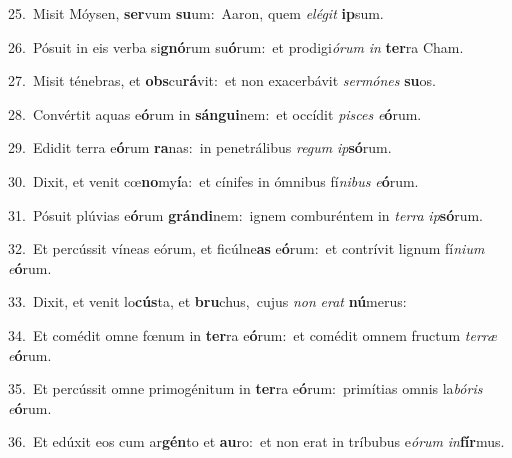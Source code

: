 {\numbfont\textcolor{\numbcolor}{25.}}~Misit Móysen, \textbf{ser}\-vum \textbf{su}\-um:~\star Aaron, quem \textit{e}\-\textit{lé}\textit{git} \textbf{ip}\-sum.\par
{\numbfont\textcolor{\numbcolor}{26.}}~Pósuit in eis verba si\-\textbf{gnó}\-rum su\-\textbf{ó}\-rum:~\star et prodigi\-\textit{ó}\-\textit{rum} \textit{in} \textbf{ter}\-ra Cham.\par
{\numbfont\textcolor{\numbcolor}{27.}}~Misit ténebras, et \textbf{obs}\-cu\-\textbf{rá}\-vit:~\star et non exacerbávit \textit{ser}\-\textit{mó}\textit{nes} \textbf{su}\-os.\par
{\numbfont\textcolor{\numbcolor}{28.}}~Convértit aquas e\-\textbf{ó}\-rum in \textbf{sán}\-\textbf{gui}nem:~\star et occídit \textit{pi}\-\textit{sces} \textit{e}\-\textbf{ó}rum.\par
{\numbfont\textcolor{\numbcolor}{29.}}~Edidit terra e\-\textbf{ó}\-rum \textbf{ra}\-nas:~\star in penetrálibus \textit{re}\-\textit{gum} \textit{ip}\-\textbf{só}rum.\par
{\numbfont\textcolor{\numbcolor}{30.}}~Dixit, et venit cœ\-\textbf{no}\-my\-\textbf{í}\-a:~\star et cínifes in ómnibus fí\-\textit{ni}\-\textit{bus} \textit{e}\-\textbf{ó}rum.\par
{\numbfont\textcolor{\numbcolor}{31.}}~Pósuit plúvias e\-\textbf{ó}\-rum \textbf{grán}\-\textbf{di}nem:~\star ignem comburéntem in \textit{ter}\-\textit{ra} \textit{ip}\-\textbf{só}rum.\par
{\numbfont\textcolor{\numbcolor}{32.}}~Et percússit víneas eórum, et ficúlne\textbf{as} e\-\textbf{ó}\-rum:~\star et contrívit lignum fí\-\textit{ni}\-\textit{um} \textit{e}\-\textbf{ó}rum.\par
{\numbfont\textcolor{\numbcolor}{33.}}~Dixit, et venit lo\-\textbf{cús}\-ta, et \textbf{bru}\-chus,~\star cujus \textit{non} \textit{e}\-\textit{rat} \textbf{nú}\-merus:\par
{\numbfont\textcolor{\numbcolor}{34.}}~Et comédit omne fœnum in \textbf{ter}\-ra e\-\textbf{ó}\-rum:~\star et comédit omnem fructum \textit{ter}\-\textit{ræ} \textit{e}\-\textbf{ó}rum.\par
{\numbfont\textcolor{\numbcolor}{35.}}~Et percússit omne primogénitum in \textbf{ter}\-ra e\-\textbf{ó}\-rum:~\star primítias omnis la\-\textit{bó}\-\textit{ris} \textit{e}\-\textbf{ó}rum.\par
{\numbfont\textcolor{\numbcolor}{36.}}~Et edúxit eos cum ar\-\textbf{gén}\-to et \textbf{au}\-ro:~\star et non erat in tríbubus e\-\textit{ó}\-\textit{rum} \textit{in}\-\textbf{fír}mus.\par

